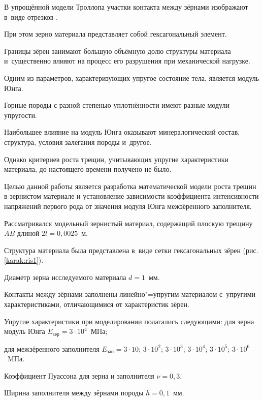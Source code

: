 В упрощённой модели Троллопа участки контакта между зёрнами изображают в~виде отрезков \cite{SpirBel:bib:Gerike}. 

При этом зерно материала представляет собой гексагональный элемент. 

Границы зёрен занимают большую объёмную долю структуры материала и~существенно влияют на процесс его разрушения при механической нагрузке. 

Одним из параметров, характеризующих упругое состояние тела, является модуль Юнга.

Горные породы с разной степенью уплотнённости имеют разные модули упругости. 

Наибольшее влияние на модуль Юнга оказывают минералогический состав, структура, условия залегания породы и~другое.

Однако критериев роста трещин, учитывающих упругие характеристики  материала, до настоящего времени получено не было. 



Целью данной работы является разработка математической модели роста трещин в зернистом материале и установление зависимости  коэффициента интенсивности напряжений первого рода от значения модуля Юнга межзёренного заполнителя.



\smallskip




Рассматривался модельный зернистый материал, содержащий плоскую трещину $AB$  длиной $2l = 0,0025$~м. 

Структура материала была представлена в~виде сетки гексагональных зёрен (рис. \ref{karak:ris1}). 

Диаметр зерна исследуемого материала $d = 1$~мм. 

Контакты между зёрнами заполнены линейно"=упругим материалом с~упругими характеристиками, отличающимися от характеристик зёрен.

Упругие характеристики при моделировании полагались следующими: для зерна модуль Юнга \mbox{$E_{\text{зер}}=3\cdot10^4$}~МПа; 

для межзёренного заполнителя  $E_{\text{зап}}=3\cdot10$; $3\cdot10^2$; $3\cdot10^3$;  $3\cdot10^4$; $3\cdot10^5$; $3\cdot10^6$~MПа. 

Коэффициент Пуассона для зерна и заполнителя \mbox{$\nu=0,3$.}

Ширина заполнителя между зёрнами породы $h = 0,1$~мм. 

